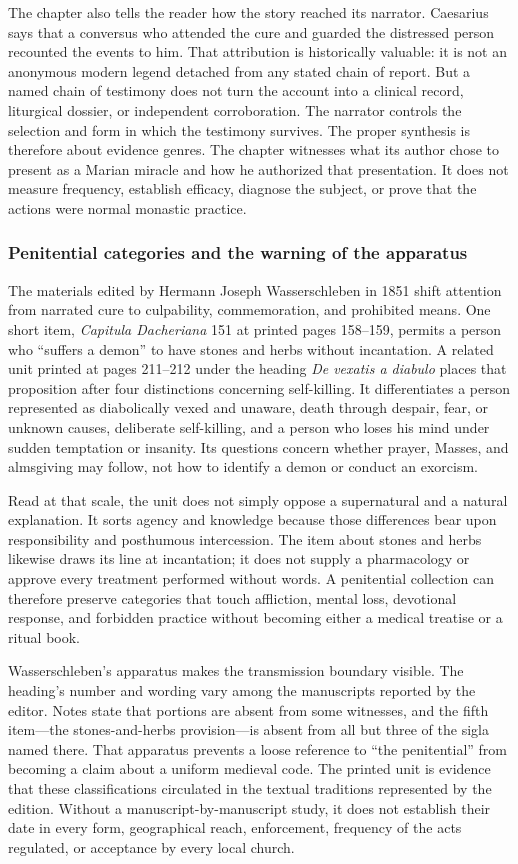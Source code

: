 The chapter also tells the reader how the story reached its narrator. Caesarius
says that a conversus who attended the cure and guarded the distressed person
recounted the events to him. That attribution is historically valuable: it is
not an anonymous modern legend detached from any stated chain of report. But a
named chain of testimony does not turn the account into a clinical record,
liturgical dossier, or independent corroboration. The narrator controls the
selection and form in which the testimony survives. The proper synthesis is
therefore about evidence genres. The chapter witnesses what its author chose
to present as a Marian miracle and how he authorized that presentation. It
does not measure frequency, establish efficacy, diagnose the subject, or prove
that the actions were normal monastic practice.

\subsubsection{Penitential categories and the warning of the apparatus}

The materials edited by Hermann Joseph Wasserschleben in 1851 shift attention
from narrated cure to culpability, commemoration, and prohibited means. One
short item, \emph{Capitula Dacheriana} 151 at printed pages 158--159, permits
a person who ``suffers a demon'' to have stones and herbs without incantation.
A related unit printed at pages 211--212 under the heading
\emph{De vexatis a diabulo} places that proposition after four distinctions
concerning self-killing. It differentiates a person represented as diabolically
vexed and unaware, death through despair, fear, or unknown causes, deliberate
self-killing, and a person who loses his mind under sudden temptation or
insanity. Its questions concern whether prayer, Masses, and almsgiving may
follow, not how to identify a demon or conduct an exorcism.

Read at that scale, the unit does not simply oppose a supernatural and a natural
explanation. It sorts agency and knowledge because those differences bear upon
responsibility and posthumous intercession. The item about stones and herbs
likewise draws its line at incantation; it does not supply a pharmacology or
approve every treatment performed without words. A penitential collection can
therefore preserve categories that touch affliction, mental loss, devotional
response, and forbidden practice without becoming either a medical treatise or
a ritual book.

Wasserschleben's apparatus makes the transmission boundary visible. The
heading's number and wording vary among the manuscripts reported by the
editor. Notes state that portions are absent from some witnesses, and the fifth
item---the stones-and-herbs provision---is absent from all but three of the
sigla named there. That apparatus prevents a loose reference to ``the
penitential'' from becoming a claim about a uniform medieval code. The printed
unit is evidence that these classifications circulated in the textual
traditions represented by the edition. Without a manuscript-by-manuscript
study, it does not establish their date in every form, geographical reach,
enforcement, frequency of the acts regulated, or acceptance by every local
church.

